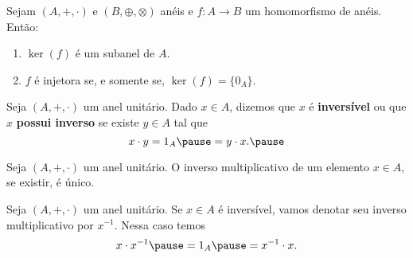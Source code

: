 \documentclass{beamer}
\begin{document}
    \begin{frame}
        \begin{proposicao}
            Sejam $(A, +, \cdot)$ e $(B, \oplus, \otimes)$ anéis \pause e $f : A \to B$ um homomorfismo de anéis. \pause Então:\pause
            \begin{enumerate}[label={\roman*})]
                \item $\ker(f)$ é um subanel de $A$.\pause

                \vspace{.5cm}

                \item $f$ é injetora \pause se, e somente se, \pause $\ker(f) = \{0_A\}$.\pause

                \vspace{.5cm}
            \end{enumerate}
        \end{proposicao}
    \end{frame}

    \begin{frame}
        \begin{definicao}
            Seja $(A, +, \cdot)$ um anel unitário. \pause Dado $x \in A$, \pause dizemos que $x$ é \textbf{inversível} \pause ou que $x$ \textbf{possui inverso} \pause se existe $y \in A$ \pause tal que\pause
            \[
                x \cdot y = 1_A \pause = y \cdot x.\pause
            \]
        \end{definicao}
    \end{frame}

    \begin{frame}
        \begin{proposicao}
            Seja $(A, +, \cdot)$ um anel unitário. \pause O inverso multiplicativo de um elemento $x \in A$, \pause se existir, \pause é único.\pause
        \end{proposicao}
    \end{frame}

    \begin{frame}
        \begin{definicao}
            Seja $(A, +, \cdot)$ um anel unitário. \pause Se $x \in A$ é inversível, \pause vamos denotar seu inverso multiplicativo por \pause $x^{-1}$. \pause Nessa caso temos\pause
            \[
                x \cdot x^{-1} \pause = 1_A \pause = x^{-1}\cdot x.
            \]
        \end{definicao}
    \end{frame}
\end{document}
